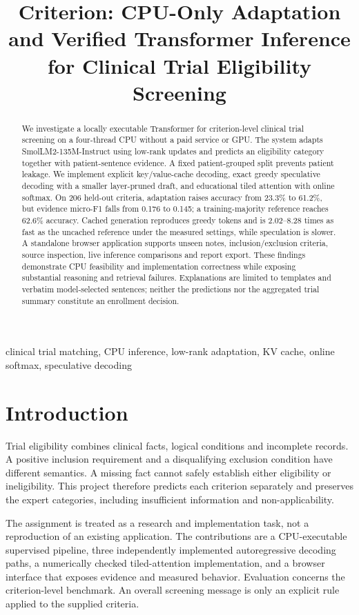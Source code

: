 \documentclass[conference]{IEEEtran}
\title{Criterion: CPU-Only Adaptation and Verified Transformer Inference for Clinical Trial Eligibility Screening}
\author{\IEEEauthorblockN{Muhammad Hashim Rahim}
\IEEEauthorblockA{Student ID: i230028\\FAST NUCES\\Generative AI, Assignment 2}}
\begin{document}
\maketitle
\begin{abstract}
We investigate a locally executable Transformer for criterion-level clinical trial screening on a four-thread CPU without a paid service or GPU. The system adapts SmolLM2-135M-Instruct using low-rank updates and predicts an eligibility category together with patient-sentence evidence. A fixed patient-grouped split prevents patient leakage. We implement explicit key/value-cache decoding, exact greedy speculative decoding with a smaller layer-pruned draft, and educational tiled attention with online softmax. On 206 held-out criteria, adaptation raises accuracy from 23.3\% to 61.2\%, but evidence micro-F1 falls from 0.176 to 0.145; a training-majority reference reaches 62.6\% accuracy. Cached generation reproduces greedy tokens and is 2.02--8.28 times as fast as the uncached reference under the measured settings, while speculation is slower. A standalone browser application supports unseen notes, inclusion/exclusion criteria, source inspection, live inference comparisons and report export. These findings demonstrate CPU feasibility and implementation correctness while exposing substantial reasoning and retrieval failures. Explanations are limited to templates and verbatim model-selected sentences; neither the predictions nor the aggregated trial summary constitute an enrollment decision.
\end{abstract}
\begin{IEEEkeywords}
clinical trial matching, CPU inference, low-rank adaptation, KV cache, online softmax, speculative decoding
\end{IEEEkeywords}

\section{Introduction}
Trial eligibility combines clinical facts, logical conditions and incomplete records. A positive inclusion requirement and a disqualifying exclusion condition have different semantics. A missing fact cannot safely establish either eligibility or ineligibility. This project therefore predicts each criterion separately and preserves the expert categories, including insufficient information and non-applicability.

The assignment is treated as a research and implementation task, not a reproduction of an existing application. The contributions are a CPU-executable supervised pipeline, three independently implemented autoregressive decoding paths, a numerically checked tiled-attention implementation, and a browser interface that exposes evidence and measured behavior. Evaluation concerns the criterion-level benchmark. An overall screening message is only an explicit rule applied to the supplied criteria.
\end{document}
